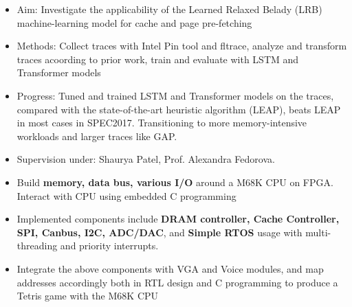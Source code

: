 \documentclass[10pt,a4paper,ragged2e,withhyper]{altacv}
\begin{document}
\begin{paracol}{2}

\begin{itemize}
\item Aim: Investigate the applicability of the Learned Relaxed Belady (LRB) machine-learning model for cache and page pre-fetching
\item Methods: Collect traces with Intel Pin tool and fltrace, analyze and transform traces acoording to prior work, train and evaluate with LSTM and Transformer models
\item Progress: Tuned and trained LSTM and Transformer models on the traces, compared with the state-of-the-art heuristic algorithm (LEAP), beats LEAP in most cases in SPEC2017. Transitioning to more memory-intensive workloads and larger traces like GAP.
\item Supervision under: Shaurya Patel, Prof. Alexandra Fedorova.
\end{itemize}




\begin{itemize}
\item Build \textbf{memory, data bus, various I/O} around a M68K CPU on FPGA. Interact with CPU using embedded C programming
\item Implemented components include \textbf{DRAM controller, Cache Controller, SPI, Canbus, I2C, ADC/DAC}, and \textbf{Simple RTOS} usage with multi-threading and priority interrupts.
\item Integrate the above components with VGA and Voice modules, and map addresses accordingly both in RTL design and C programming to produce a Tetris game with the M68K CPU
\end{itemize}

\divider


\end{paracol}
\end{document}
